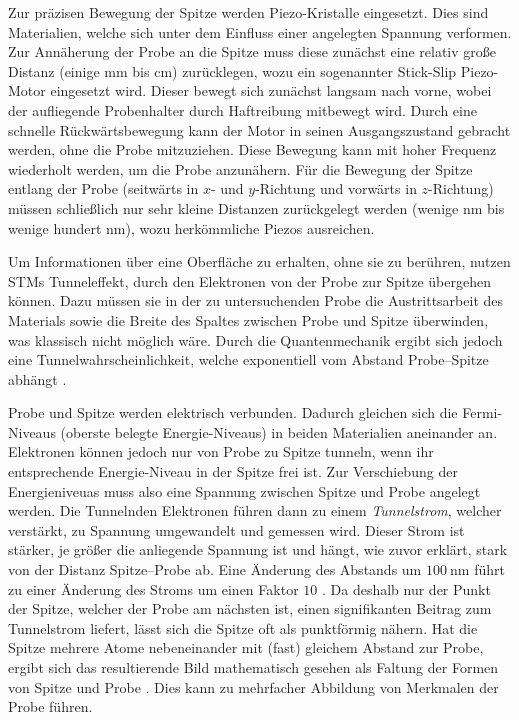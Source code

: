 \documentclass{article}
\newcommand{\defc}{black}
\newcommand{\colorT}[2][blue]{\color{#1}{#2}\color{\defc}}
\newcommand{\todo}[1]{\colorT[red]{\textbf{(#1)}}}
\begin{document}
Zur präzisen Bewegung der Spitze werden Piezo-Kristalle eingesetzt. 
Dies sind Materialien, welche sich unter dem Einfluss einer angelegten Spannung
verformen. Zur Annäherung der Probe an die Spitze muss diese zunächst eine relativ 
große Distanz (einige \si{\mm} bis \si{cm}) zurücklegen, wozu ein sogenannter Stick-Slip
Piezo-Motor eingesetzt wird. Dieser bewegt sich zunächst langsam nach vorne, wobei
der aufliegende Probenhalter durch Haftreibung mitbewegt wird. Durch eine schnelle
Rückwärtsbewegung kann der Motor in seinen Ausgangszustand gebracht werden, ohne die
Probe mitzuziehen. Diese Bewegung kann mit hoher Frequenz wiederholt werden, um die Probe anzunähern.
Für die Bewegung der Spitze entlang der Probe (seitwärts in $x$- und $y$-Richtung und
vorwärts in $z$-Richtung) müssen schließlich nur sehr kleine Distanzen zurückgelegt
werden (wenige \si{nm} bis wenige hundert \si{\nm}), wozu herkömmliche Piezos ausreichen.

Um Informationen über eine Oberfläche zu erhalten, ohne sie zu berühren, nutzen STMs
Tunneleffekt, durch den Elektronen von der Probe zur Spitze übergehen können.
Dazu müssen sie in der zu untersuchenden Probe die Austrittsarbeit des Materials 
sowie  die Breite des Spaltes zwischen Probe und Spitze überwinden,
was klassisch nicht möglich wäre. Durch die Quantenmechanik ergibt sich jedoch eine
Tunnelwahrscheinlichkeit, welche exponentiell vom Abstand Probe--Spitze abhängt \todo{Quelle}.

Probe und Spitze werden elektrisch verbunden. Dadurch gleichen sich die Fermi-Niveaus (oberste belegte Energie-Niveaus) in beiden Materialien aneinander an.
Elektronen können jedoch nur von Probe zu Spitze tunneln, wenn ihr entsprechende Energie-Niveau
in der Spitze frei ist. Zur Verschiebung der Energieniveuas muss also eine Spannung zwischen Spitze und Probe angelegt werden.
Die Tunnelnden Elektronen führen dann zu einem \textit{Tunnelstrom}, welcher verstärkt,
zu Spannung umgewandelt und gemessen wird. Dieser Strom ist stärker, je größer die
anliegende Spannung ist und hängt,
wie zuvor erklärt, stark von der Distanz Spitze--Probe ab. Eine Änderung des Abstands
um $\SI{100}{\nm}$ führt zu einer Änderung des Stroms um einen Faktor $10$ \cite{naio-video}.
Da deshalb nur der Punkt der Spitze, welcher der Probe am nächsten ist, einen signifikanten Beitrag zum Tunnelstrom liefert,
lässt sich die Spitze oft als punktförmig nähern.
Hat die Spitze mehrere Atome nebeneinander mit (fast) gleichem Abstand zur Probe,
ergibt sich das resultierende Bild mathematisch gesehen als Faltung der Formen
von Spitze und Probe \cite{Anleitung}. Dies kann zu mehrfacher Abbildung von 
Merkmalen der Probe führen.
\end{document}
